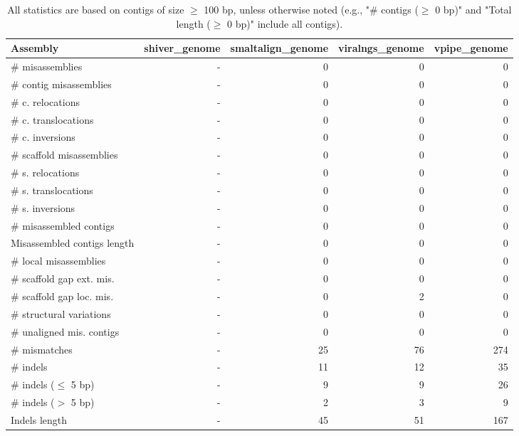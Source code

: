 \documentclass[12pt,a4paper]{article}
\begin{document}
\begin{table}[ht]
\begin{center}
\caption{All statistics are based on contigs of size $\geq$ 100 bp, unless otherwise noted (e.g., "\# contigs ($\geq$ 0 bp)" and "Total length ($\geq$ 0 bp)" include all contigs).}
\begin{tabular}{|l*{4}{|r}|}
\hline
Assembly & shiver\_genome & smaltalign\_genome & viralngs\_genome & vpipe\_genome \\ \hline
\# misassemblies & - & 0 & 0 & 0 \\ \hline
\hspace{2mm}\# contig misassemblies & - & 0 & 0 & 0 \\ \hline
\hspace{5mm}\# c. relocations & - & 0 & 0 & 0 \\ \hline
\hspace{5mm}\# c. translocations & - & 0 & 0 & 0 \\ \hline
\hspace{5mm}\# c. inversions & - & 0 & 0 & 0 \\ \hline
\hspace{2mm}\# scaffold misassemblies & - & 0 & 0 & 0 \\ \hline
\hspace{5mm}\# s. relocations & - & 0 & 0 & 0 \\ \hline
\hspace{5mm}\# s. translocations & - & 0 & 0 & 0 \\ \hline
\hspace{5mm}\# s. inversions & - & 0 & 0 & 0 \\ \hline
\# misassembled contigs & - & 0 & 0 & 0 \\ \hline
Misassembled contigs length & - & 0 & 0 & 0 \\ \hline
\# local misassemblies & - & 0 & 0 & 0 \\ \hline
\# scaffold gap ext. mis. & - & 0 & 0 & 0 \\ \hline
\# scaffold gap loc. mis. & - & 0 & 2 & 0 \\ \hline
\# structural variations & - & 0 & 0 & 0 \\ \hline
\# unaligned mis. contigs & - & 0 & 0 & 0 \\ \hline
\# mismatches & - & 25 & 76 & 274 \\ \hline
\# indels & - & 11 & 12 & 35 \\ \hline
\hspace{5mm}\# indels ($\leq$ 5 bp) & - & 9 & 9 & 26 \\ \hline
\hspace{5mm}\# indels ($>$ 5 bp) & - & 2 & 3 & 9 \\ \hline
Indels length & - & 45 & 51 & 167 \\ \hline
\end{tabular}
\end{center}
\end{table}
\end{document}
